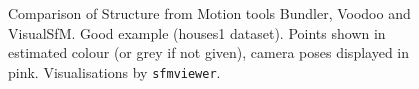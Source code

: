 \begin{figure}[htb!]
 \centering
 \caption{Comparison of Structure from Motion tools Bundler, Voodoo and VisualSfM. Good example (houses1 dataset). Points shown in estimated colour (or grey if not given), camera poses displayed in pink. Visualisations by \texttt{sfmviewer}.}
 \label{fig:sfmcomparison2}
\end{figure}

